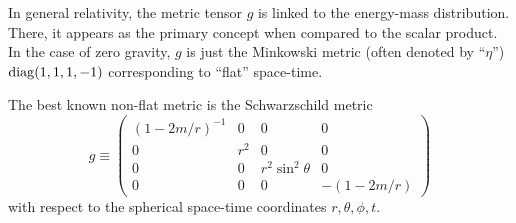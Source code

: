 In general relativity, the metric tensor $g$ is linked to the energy-mass distribution.
There, it appears as the primary concept when compared to the scalar product.
In the case of zero gravity, $g$ is just the  Minkowski metric (often denoted by  ``$\eta$'')
${\rm diag} (1,1,1,-1) $ corresponding to ``flat'' space-time.

The best known non-flat metric is the Schwarzschild metric
\begin{equation}
g
\equiv
\begin{pmatrix}
(1-2m/r)^{-1}&0&0&0\\
0&r^2&0&0\\
0&0&r^2\sin^2 \theta &0\\
0&0&0&- \left( 1-{2m/r}\right)
\end{pmatrix}
\end{equation}
with respect to the spherical space-time coordinates $r,\theta ,\phi ,t$.

